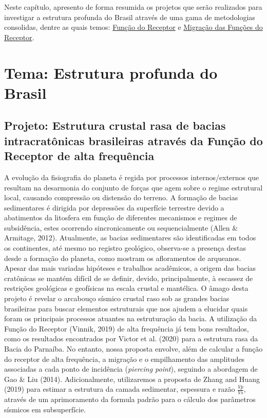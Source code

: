 \documentclass[10pt,a4paper,oneside]{book}
\begin{document}
Neste capítulo, apresento de forma resumida os projetos que serão realizados para investigar a estrutura profunda do Brasil através de uma gama de metodologias consolidas, dentre as quais temos: \href{https://doi.org/10.1029/JB084iB09p04749}{Função do Receptor} e \href{https://doi.org/10.1016/j.epsl.2013.08.025}{Migração das Funções do Receptor}.   

\section{Tema: Estrutura profunda do Brasil}

\subsection{Projeto: Estrutura crustal rasa de bacias intracratônicas brasileiras através da Função do Receptor de alta frequência}

A evolução da fisiografia do planeta é regida por processos internos/externos que resultam na desarmonia do conjunto de forças que agem sobre o regime estrutural local, causando compressão ou distensão do terreno. A formação de bacias sedimentares é dirigida por depressões da superfície terrestre devido a abatimentos da litosfera em função de diferentes mecanismos e regimes de subsidência, estes ocorrendo sincronicamente ou sequencialmente (Allen \& Armitage, 2012). Atualmente, as bacias sedimentares são identificadas em todos os continentes, até mesmo no registro geológico, observa-se a presença destas desde a formação do planeta, como mostram os afloramentos de arqueanos. Apesar das mais variadas hipóteses e trabalhos acadêmicos, a origem das bacias cratônicas se mantém difícil de se definir, devido, principalmente, à escassez de restrições geológicas e geofísicas na escala crustal e mantélica. O âmago desta projeto é revelar o arcabouço sísmico crustal raso sob as grandes bacias brasileiras para buscar elementos estruturais que nos ajudem a elucidar quais foram os principais processos atuantes na estruturação da bacia. A utilização da Função do Receptor (Vinnik, 2019) de alta frequência já tem bons resultados, como os resultados encontrados por Victor et al. (2020) para a estrutura rasa da Bacia do Parnaíba. No entanto, nossa proposta envolve, além de calcular a função do receptor de alta frequência, a migração e o empilhamento das amplitudes associadas a cada ponto de incidência (\textit{piercing point}), seguindo a abordagem de Gao \& Liu (2014). Adicionalmente, utilizaremos a proposta de Zhang and Huang (2019) para estimar a estrutura da camada sedimentar, espessura e razão $\frac{Vp}{Vs}$, através de um aprimoramento da formula padrão para o cálculo dos parâmetros sísmicos em subsuperfície.
\end{document}
